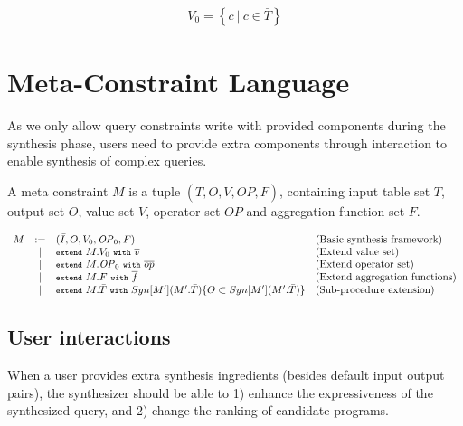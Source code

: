 \documentclass[letter, notitlepage]{article}
\newcommand{\code}[1]{\texttt{\footnotesize #1}}
\begin{document}
\[
\begin{array}{l}
	V_0 = \left\{c~|~c\in \bar{T} \right\}
\end{array}
\]

\section{Meta-Constraint Language}
As we only allow query constraints write with provided components during the synthesis phase, users need to provide extra components through interaction to enable synthesis of complex queries.

A meta constraint $M$ is a tuple $(\bar{T},O, V, \mathit{OP}, F)$, containing input table set $\bar{T}$, output set $O$, value set $V$, operator set $\mathit{OP}$ and aggregation function set $F$.

\[
\begin{array}{rcll}
	M & := & (\bar{I}, O, V_0, \mathit{OP}_0, F) & \text{(Basic synthesis framework)}\\
		& |  & \code{extend}~M.V_0~\code{with}~\overline{v} & \text{(Extend value set)}\\
		& |  & \code{extend}~M.\mathit{OP}_0~\code{with}~\overline{op} & \text{(Extend operator set)}\\
		& |  & \code{extend}~M.F~\code{with}~\overline{f} & \text{(Extend aggregation functions)}\\
		& |  & \code{extend}~M.\bar{T}~\code{with}~Syn[M'](M'.\bar{T})\{O\subset Syn[M'](M'.\bar{T})\} & \text{(Sub-procedure extension)}
\end{array}
\]

\subsection{User interactions}
When a user provides extra synthesis ingredients (besides default input output pairs), the synthesizer should be able to 1) enhance the expressiveness of the synthesized query, and 2) change the ranking of candidate programs.
\end{document}
